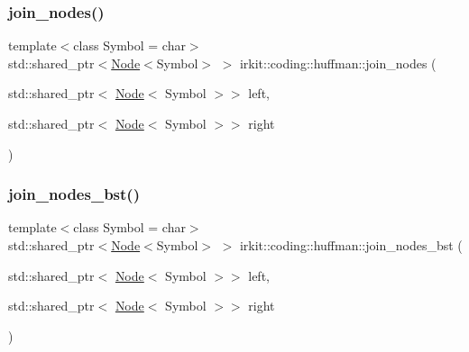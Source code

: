 \mbox{\label{namespaceirkit_1_1coding_1_1huffman_a80bc59947120a14857cf6b6344ad098d}} 
\subsubsection{\texorpdfstring{join\+\_\+nodes()}{join\_nodes()}}
{\footnotesize\ttfamily template$<$class Symbol  = char$>$ \\
std\+::shared\+\_\+ptr$<$\mbox{\hyperlink{structirkit_1_1coding_1_1huffman_1_1Node}{Node}}$<$Symbol$>$ $>$ irkit\+::coding\+::huffman\+::join\+\_\+nodes (\begin{DoxyParamCaption}\item[{std\+::shared\+\_\+ptr$<$ \mbox{\hyperlink{structirkit_1_1coding_1_1huffman_1_1Node}{Node}}$<$ Symbol $>$$>$}]{left,  }\item[{std\+::shared\+\_\+ptr$<$ \mbox{\hyperlink{structirkit_1_1coding_1_1huffman_1_1Node}{Node}}$<$ Symbol $>$$>$}]{right }\end{DoxyParamCaption})}

\mbox{\label{namespaceirkit_1_1coding_1_1huffman_a30c3c75cbb0b183ff00975ec478ac348}} 
\subsubsection{\texorpdfstring{join\+\_\+nodes\+\_\+bst()}{join\_nodes\_bst()}}
{\footnotesize\ttfamily template$<$class Symbol  = char$>$ \\
std\+::shared\+\_\+ptr$<$\mbox{\hyperlink{structirkit_1_1coding_1_1huffman_1_1Node}{Node}}$<$Symbol$>$ $>$ irkit\+::coding\+::huffman\+::join\+\_\+nodes\+\_\+bst (\begin{DoxyParamCaption}\item[{std\+::shared\+\_\+ptr$<$ \mbox{\hyperlink{structirkit_1_1coding_1_1huffman_1_1Node}{Node}}$<$ Symbol $>$$>$}]{left,  }\item[{std\+::shared\+\_\+ptr$<$ \mbox{\hyperlink{structirkit_1_1coding_1_1huffman_1_1Node}{Node}}$<$ Symbol $>$$>$}]{right }\end{DoxyParamCaption})}

